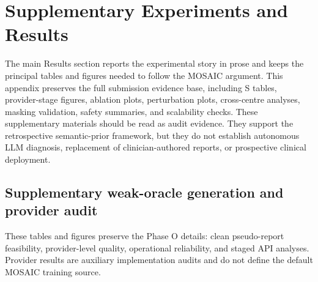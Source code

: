 \clearpage
\section{Supplementary Experiments and Results}
\label{sec:supplementary_experiments_results}

The main Results section reports the experimental story in prose and keeps the principal tables and figures needed to follow the MOSAIC argument. This appendix preserves the full submission evidence base, including S tables, provider-stage figures, ablation plots, perturbation plots, cross-centre analyses, masking validation, safety summaries, and scalability checks. These supplementary materials should be read as audit evidence. They support the retrospective semantic-prior framework, but they do not establish autonomous LLM diagnosis, replacement of clinician-authored reports, or prospective clinical deployment.

\subsection{Supplementary weak-oracle generation and provider audit}
These tables and figures preserve the Phase O details: clean pseudo-report feasibility, provider-level quality, operational reliability, and staged API analyses. Provider results are auxiliary implementation audits and do not define the default MOSAIC training source.

